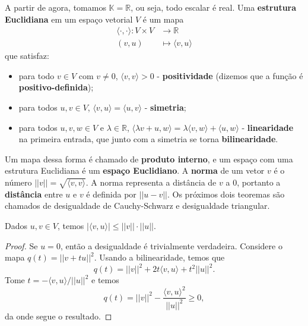 A partir de agora, tomamos $\mathbb{K} = \mathbb{R}$, ou seja, todo escalar é real. Uma \textbf{estrutura Euclidiana} em um espaço vetorial $V$ é um mapa \begin{equation}
    \begin{split}
        \langle \cdot, \cdot \rangle \colon V \times V &\to \mathbb{R} \\ (v,u) &\mapsto \langle v, u \rangle
    \end{split}
\end{equation} que satisfaz: \begin{itemize}
    \item para todo $v \in V$ com $v \neq 0$, $\langle v, v \rangle > 0$ - \textbf{positividade} (dizemos que a função é \textbf{positivo-definida});
    \item para todos $u, v \in V$, $\langle v, u \rangle = \langle u, v \rangle$ - \textbf{simetria};
    \item para todos $u, v, w \in V$ e $\lambda \in \mathbb{R}$, $\langle \lambda v + u, w \rangle = \lambda \langle v, w \rangle + \langle u, w \rangle$ - \textbf{linearidade} na primeira entrada, que junto com a simetria se torna \textbf{bilinearidade}.
\end{itemize}
Um mapa dessa forma é chamado de \textbf{produto interno}, e um espaço com uma estrutura Euclidiana é um \textbf{espaço Euclidiano}. A \textbf{norma} de um vetor $v$ é o número $||v|| = \sqrt{\langle v, v \rangle}$. A norma representa a distância de $v$ a $0$, portanto a \textbf{distância} entre $u$ e $v$ é definida por $||u - v||$. Os próximos dois teoremas são chamados de desigualdade de Cauchy-Schwarz e desigualdade triangular.

\begin{theorem}
    Dados $u, v \in V$, temos $|\langle v, u \rangle| \leq ||v||\cdot||u||$.
\end{theorem}
\begin{proof}
    Se $u = 0$, então a desigualdade é trivialmente verdadeira. Considere o mapa $q(t) = ||v + tu||^2$. Usando a bilinearidade, temos que \begin{equation}
        q(t) = ||v||^2 + 2t\langle v, u \rangle + t^2||u||^2.
    \end{equation} Tome $t = -\langle v, u \rangle/||u||^2$ e temos \begin{equation}
        q(t) = ||v||^2 - \frac{\langle v, u \rangle^2}{||u||^2} \geq 0,
    \end{equation} da onde segue o resultado.
\end{proof}

